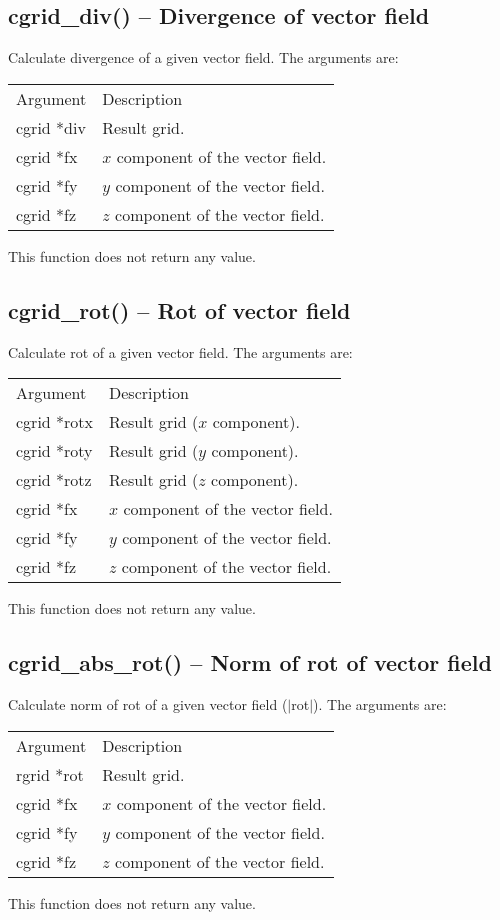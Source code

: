 \documentclass[12pt,letterpaper]{report}
\begin{document}
\subsection{cgrid\_div() -- Divergence of vector field}

Calculate divergence of a given vector field. The arguments are:
\begin{longtable}{p{} p{}}
Argument & Description\\
\cline{1-2}
cgrid *div & Result grid.\\
cgrid *fx  & $x$ component of the vector field.\\
cgrid *fy  & $y$ component of the vector field.\\
cgrid *fz  & $z$ component of the vector field.\\
\end{longtable}
\noindent
This function does not return any value. 

\subsection{cgrid\_rot() -- Rot of vector field}

Calculate rot of a given vector field. The arguments are:
\begin{longtable}{p{} p{}}
Argument & Description\\
\cline{1-2}
cgrid *rotx & Result grid ($x$ component).\\
cgrid *roty & Result grid ($y$ component).\\
cgrid *rotz & Result grid ($z$ component).\\
cgrid *fx  & $x$ component of the vector field.\\
cgrid *fy  & $y$ component of the vector field.\\
cgrid *fz  & $z$ component of the vector field.\\
\end{longtable}
\noindent
This function does not return any value. 

\subsection{cgrid\_abs\_rot() -- Norm of rot of vector field}

Calculate norm of rot of a given vector field ($|$rot$|$). The arguments are:
\begin{longtable}{p{} p{}}
Argument & Description\\
\cline{1-2}
rgrid *rot & Result grid.\\
cgrid *fx  & $x$ component of the vector field.\\
cgrid *fy  & $y$ component of the vector field.\\
cgrid *fz  & $z$ component of the vector field.\\
\end{longtable}
\noindent
This function does not return any value. 
\end{document}
